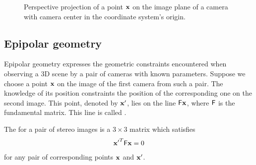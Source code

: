\begin{figure}[h]
  \caption{Perspective projection of a point $\mathbf{x}$ on the image plane of a camera with camera center in the coordinate system's origin. }
  \label{fig:camera}
\end{figure}

\subsection{Epipolar geometry}
\label{sec:epi}

Epipolar geometry expresses the geometric constraints encountered when observing a 3D scene by a pair of cameras with known parameters. 
Suppose we choose a point $\mathbf{x}$ on the image of the first camera from such a pair.
The knowledge of its position constraints the position of the corresponding one on the second image.
This point, denoted by $\mathbf{x'}$, lies on the line $\mathsf{F}\mathbf{x}$, where $\mathsf{F}$ is the fundamental matrix.
This line is called .

\begin{definition}
The  for a pair of stereo images is a $3 \times 3$ matrix which satisfies 
\begin{align*}
\mathbf{x'}^T \mathsf{F} \mathbf{x} = 0
\end{align*}
for any pair of corresponding points $\mathbf{x}$ and $\mathbf{x'}$.
\end{definition}


